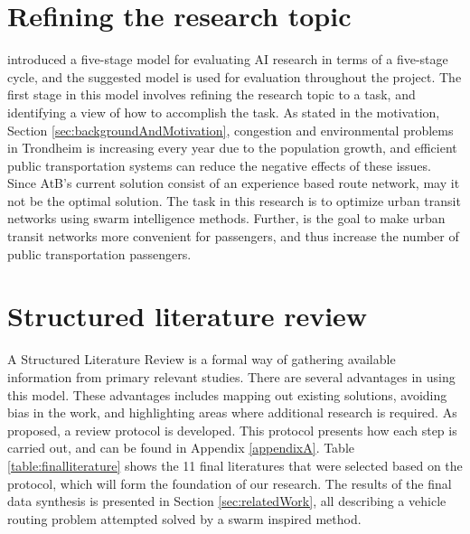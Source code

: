 \section{Refining the research topic}
\label{sec:definingResearchTopic}

\citet{cohen88} introduced a five-stage model for evaluating AI research in terms of a five-stage cycle, and the suggested model is used for evaluation throughout the project. The first stage in this model involves refining the research topic to a task, and identifying a view of how to accomplish the task. As stated in the motivation, Section \vref{sec:backgroundAndMotivation}, congestion and environmental problems in Trondheim is increasing every year due to the population growth, and efficient public transportation systems can reduce the negative effects of these issues. Since AtB's current solution consist of an experience based route network, may it not be the optimal solution. The task in this research is to optimize urban transit networks using swarm intelligence methods. Further, is the goal to make urban transit networks more convenient for passengers, and thus increase the number of public transportation passengers.

\section{Structured literature review}
\label{sec:structuredLiteratureReview}

A Structured Literature Review is a formal way of gathering available information from primary relevant studies\citep{kofod2014}. There are several advantages in using this model. These advantages includes mapping out existing solutions, avoiding bias in the work, and highlighting areas where additional research is required. As proposed, a review protocol is developed. This protocol presents how each step is carried out, and can be found in Appendix \vref{appendixA}. Table \ref{table:finalliterature} shows the 11 final literatures that were selected based on the protocol, which will form the foundation of our research. The results of the final data synthesis is presented in Section \vref{sec:relatedWork}, all describing a vehicle routing problem attempted solved by a swarm inspired method.  %


